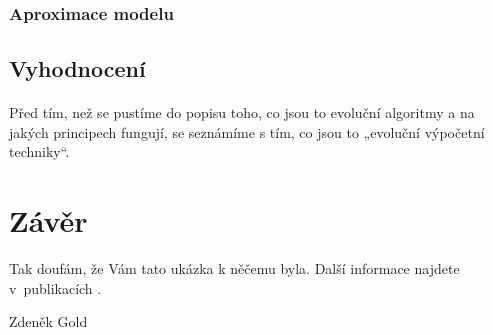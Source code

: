 \documentclass[bc,male,java,dept460]{diploma}		%
\begin{document}
\paragraph*{}


\subsubsection{Aproximace modelu}
\paragraph*{}


\subsection{Vyhodnocení}
\paragraph*{}
Před tím, než se pustíme do popisu toho, co jsou to evoluční algoritmy a na jakých principech fungují, se seznámíme s tím, co jsou to „evoluční výpočetní techniky“.

\section{Závěr}
\label{sec:Conclusion}
Tak doufám, že Vám tato ukázka k něčemu byla. Další informace najdete v~publikacích
\cite{goossens94,lamport94}.

\bigskip
\begin{flushright}
Zdeněk Gold
\end{flushright}
\end{document}
